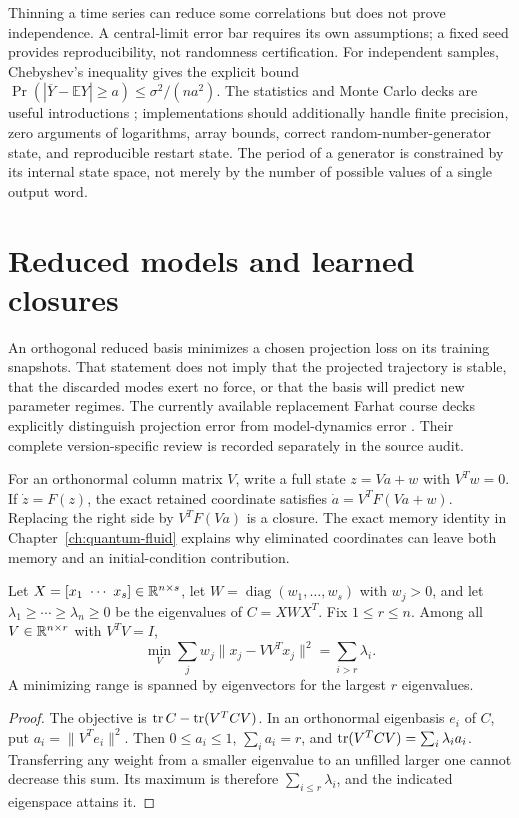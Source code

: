 Thinning a time series can reduce some correlations but does not prove
independence.  A central-limit error bar requires its own assumptions;
a fixed seed provides reproducibility, not randomness certification.
For independent samples, Chebyshev's inequality gives the explicit
bound
$\Pr(|\overline Y-\mathbb EY|\ge a)\le\sigma^2/(na^2)$.
The statistics and Monte Carlo decks are useful introductions
\citep{microVolkov04,microVolkov05}; implementations should additionally
handle finite precision, zero arguments of logarithms, array bounds,
correct random-number-generator state, and reproducible restart state.
The period of a generator is constrained by its internal state space,
not merely by the number of possible values of a single output word.

\section{Reduced models and learned closures}

An orthogonal reduced basis minimizes a chosen projection loss on its
training snapshots.  That statement does not imply that the projected
trajectory is stable, that the discarded modes exert no force, or that
the basis will predict new parameter regimes.  The currently available
replacement Farhat course decks explicitly distinguish projection
error from model-dynamics error \citep{microFarhatCourse}.  Their
complete version-specific review is recorded separately in the source
audit.

For an orthonormal column matrix $V$, write a full state
$z=Va+w$ with $V^Tw=0$.  If $\dot z=F(z)$, the exact retained
coordinate satisfies $\dot a=V^TF(Va+w)$.  Replacing the right
side by $V^TF(Va)$ is a closure.  The exact memory identity in
Chapter~\ref{ch:quantum-fluid} explains why eliminated coordinates
can leave both memory and an initial-condition contribution.

\begin{proposition}
\label{prop:micro-pod}
Let $X=[x_1\ \cdots\ x_s]\in\mathbb{R}^{n\times s}$, let
$W=\operatorname{diag}(w_1,\ldots,w_s)$ with $w_j>0$, and
let $\lambda_1\ge\cdots\ge\lambda_n\ge0$ be the eigenvalues
of $C=XWX^T$.  Fix $1\le r\le n$.  Among all
$V\in\mathbb{R}^{n\times r}$ with $V^TV=I$,
\[
 \min_V\sum_jw_j\|x_j-VV^Tx_j\|^2
 =\sum_{i>r}\lambda_i.
\]
A minimizing range is spanned by eigenvectors for the largest
$r$ eigenvalues.
\end{proposition}
\begin{proof}
The objective is $\operatorname{tr} C-\operatorname{tr}(V^TCV)$.  In an orthonormal
eigenbasis $e_i$ of $C$, put $a_i=\|V^Te_i\|^2$.
Then $0\le a_i\le1$, $\sum_i a_i=r$, and
$\operatorname{tr}(V^TCV)=\sum_i\lambda_i a_i$.  Transferring any weight
from a smaller eigenvalue to an unfilled larger one cannot decrease
this sum.  Its maximum is therefore $\sum_{i\le r}\lambda_i$,
and the indicated eigenspace attains it.
\end{proof}

